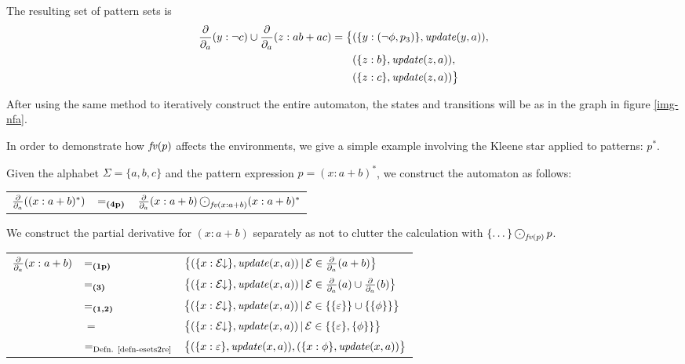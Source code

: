 \begin{eg}
   The resulting set of pattern sets is
   \begin{align*}
      \frac{\partial}{\partial_{a}}(y:\neg c) \cup \frac{\partial}{\partial_{a}}(z:ab + ac) =
      \big\{
      & (\{ y:(\neg\phi, p_3) \}, \mathit{update}(y, a)), \\
      & (\{ z:b \}, \mathit{update}(z, a)), \\
      & (\{ z:c \}, \mathit{update}(z, a))
      \big\}
   \end{align*}

   After using the same method to iteratively construct the entire automaton,
   the states and transitions will be as in the graph in figure \ref{img-nfa}.


\end{eg}


\begin{eg}
   In order to demonstrate how $\iteratefvp$ affects the environments, we give a
   simple example involving the Kleene star applied to patterns: $p^*$.

   Given the alphabet $\Sigma = \{a, b, c\}$ and the pattern expression
   $p = (x:a+b)^*$, we construct the automaton as follows:

   \begin{tabular}{lll}
      $\frac{\partial}{\partial_{a}}((x:a+b)^*)$
      & $=_{\textbf{(4p)}}$ &
      $\dda(x:a+b) \circledcdot_{\iteratefv{x:a+b}} (x:a+b)^*$ \\
   \end{tabular}

   We construct the partial derivative for $(x:a+b)$ separately as not to
   clutter the calculation with $\{ \dots \} \circledcdot_{\iteratefvp} p$.

   \begin{tabular}{lll}
      $\frac{\partial}{\partial_{a}}(x:a+b)$
      & $=_{\textbf{(1p)}}$ &
      $\big\{ (\{ x:\mathcal{E}\!\!\downarrow \}, \mathit{update}(x, a)) \operatorname{|} \mathcal{E} \in \frac{\partial}{\partial_{a}}(a+b) \big\}$ \\
      & $=_{\textbf{(3)}}$ &
      $\big\{ (\{ x:\mathcal{E}\!\!\downarrow \}, \mathit{update}(x, a)) \operatorname{|} \mathcal{E} \in \frac{\partial}{\partial_{a}}(a) \cup \frac{\partial}{\partial_{a}}(b) \big\}$ \\
      & $=_{\textbf{(1,2)}}$ &
      $\big\{ (\{ x:\mathcal{E}\!\!\downarrow \}, \mathit{update}(x, a)) \operatorname{|} \mathcal{E} \in \{\{\varepsilon\}\} \cup \{\{\phi\}\} \big\}$ \\
      & $=$ &
      $\big\{ (\{ x:\mathcal{E}\!\!\downarrow \}, \mathit{update}(x, a)) \operatorname{|} \mathcal{E} \in \{\{\varepsilon\}, \{\phi\}\} \big\}$ \\
      & $=_{\text{Defn. \ref{defn-esets2re}}}$ &
      $\big\{ (\{ x:\varepsilon \}, \mathit{update}(x, a)), (\{ x:\phi \}, \mathit{update}(x, a)) \big\}$ \\
   \end{tabular}


\end{eg}
